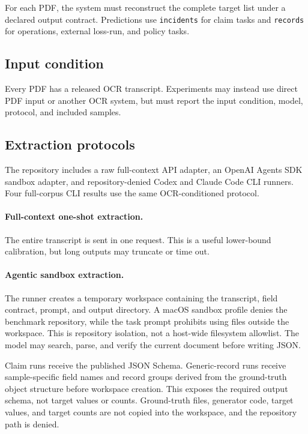 For each PDF, the system must reconstruct the complete target list under a declared output contract. Predictions use \texttt{incidents} for claim tasks and \texttt{records} for operations, external loss-run, and policy tasks.

\subsection{Input condition}
Every PDF has a released OCR transcript. Experiments may instead use direct PDF input or another OCR system, but must report the input condition, model, protocol, and included samples.

\subsection{Extraction protocols}
\label{subsec:extraction-protocols}
The repository includes a raw full-context API adapter, an OpenAI Agents SDK sandbox adapter, and repository-denied Codex and Claude Code CLI runners. Four full-corpus CLI results use the same OCR-conditioned protocol.

\paragraph{Full-context one-shot extraction.}
The entire transcript is sent in one request. This is a useful lower-bound calibration, but long outputs may truncate or time out.

\paragraph{Agentic sandbox extraction.}
The runner creates a temporary workspace containing the transcript, field contract, prompt, and output directory. A macOS sandbox profile denies the benchmark repository, while the task prompt prohibits using files outside the workspace. This is repository isolation, not a host-wide filesystem allowlist. The model may search, parse, and verify the current document before writing JSON.

Claim runs receive the published JSON Schema. Generic-record runs receive sample-specific field names and record groups derived from the ground-truth object structure before workspace creation. This exposes the required output schema, not target values or counts. Ground-truth files, generator code, target values, and target counts are not copied into the workspace, and the repository path is denied.

